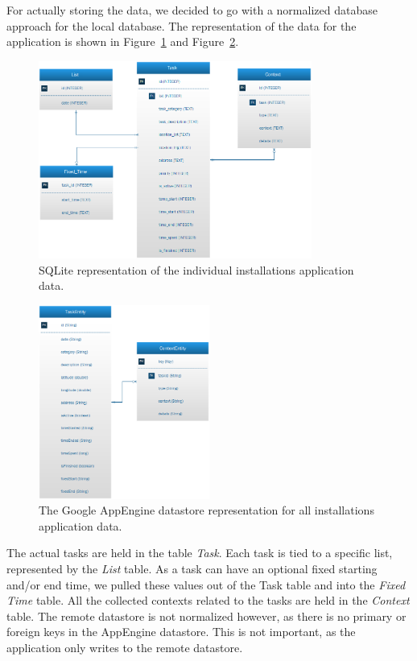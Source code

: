 For actually storing the data, we decided to go with a normalized database approach for the local database. The representation of the data for the application is shown in Figure~\ref{fig:databasemodel} and Figure~\ref{fig:databasemodelexternal}.
\begin{figure}[tbp]
  \centering
  \includegraphics[width=0.8\textwidth]{figures/DatabaseModel.png}
  \caption[Database model]{SQLite representation of the individual installations application data.}
  \label{fig:databasemodel}
\end{figure}
\begin{figure}[tbp]
  \centering
  \includegraphics[width=0.5\textwidth]{figures/DatabaseModel_external.png}
  \caption[External database model]{The Google AppEngine datastore representation for all installations application data.}
  \label{fig:databasemodelexternal}
\end{figure}
The actual tasks are held in the table \emph{Task}. Each task is tied to a specific list, represented by the \emph{List} table. As a task can have an optional fixed starting and/or end time, we pulled these values out of the Task table and into the \emph{Fixed Time} table. All the collected contexts related to the tasks are held in the \emph{Context} table. The remote datastore is not normalized however, as there is no primary or foreign keys in the AppEngine datastore. This is not important, as the application only writes to the remote datastore.

